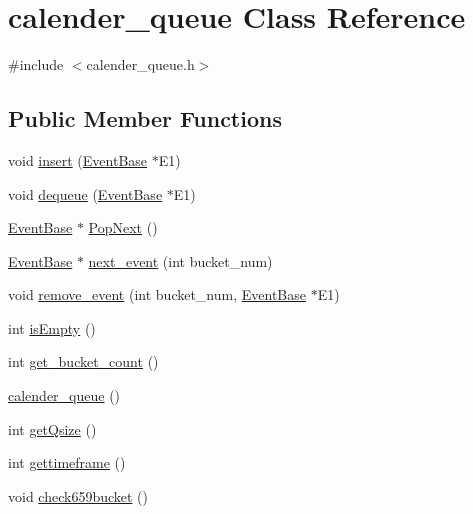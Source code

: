 \hypertarget{classcalender__queue}{\section{calender\-\_\-queue Class Reference}
\label{classcalender__queue}
}


{\ttfamily \#include $<$calender\-\_\-queue.\-h$>$}

\subsection*{Public Member Functions}
\begin{DoxyCompactItemize}
\item 
void \hyperlink{classcalender__queue_a9908e97c05434b58fca91d5327cf479b}{insert} (\hyperlink{class_event_base}{Event\-Base} $\ast$E1)
\item 
void \hyperlink{classcalender__queue_ad751210f4fe9885234857ca428799c18}{dequeue} (\hyperlink{class_event_base}{Event\-Base} $\ast$E1)
\item 
\hyperlink{class_event_base}{Event\-Base} $\ast$ \hyperlink{classcalender__queue_aa789e7ebf2e4b0509ba6c986f4485655}{Pop\-Next} ()
\item 
\hyperlink{class_event_base}{Event\-Base} $\ast$ \hyperlink{classcalender__queue_ac6070fec29a645ecce9bc5ded0c0de18}{next\-\_\-event} (int bucket\-\_\-num)
\item 
void \hyperlink{classcalender__queue_a5643aa39133a7c8d62b465752c62ad88}{remove\-\_\-event} (int bucket\-\_\-num, \hyperlink{class_event_base}{Event\-Base} $\ast$E1)
\item 
int \hyperlink{classcalender__queue_a8d42460de7de2396f588c8f9a5aa099f}{is\-Empty} ()
\item 
int \hyperlink{classcalender__queue_a78818b6767d5f432dd4b4e629ca72435}{get\-\_\-bucket\-\_\-count} ()
\item 
\hyperlink{classcalender__queue_ae60c0a818d3de5b7e2e3e8f5e9919923}{calender\-\_\-queue} ()
\item 
int \hyperlink{classcalender__queue_ac6b4b6d42278a5c88de4550d4b7f4017}{get\-Qsize} ()
\item 
int \hyperlink{classcalender__queue_a3985b2b2d55245ec4b70e79e1588c608}{gettimeframe} ()
\item 
void \hyperlink{classcalender__queue_a3b911c0f17d0cac2ff6c2a261d123a78}{check659bucket} ()
\end{DoxyCompactItemize}


